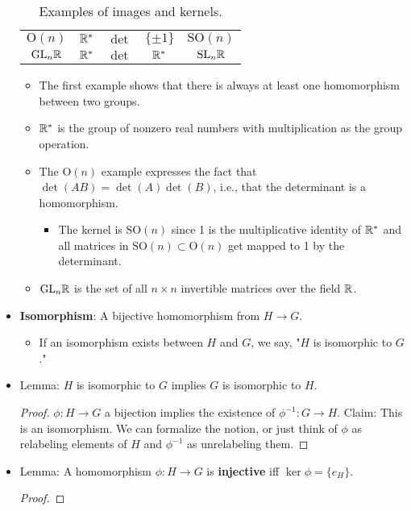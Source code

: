 \documentclass[../notes.tex]{subfiles}
\begin{document}
\begin{itemize}
\begin{table}[h!]
\begin{tabular}{c|c|c|c|c}
            $\text{O}(n)$ & $\mathbb{R}^*$ & $\det$ & $\{\pm 1\}$ & $\text{SO}(n)$\\
            $\text{GL}_n\mathbb{R}$ & $\mathbb{R}^*$ & $\det$ & $\mathbb{R}^*$ & $\text{SL}_n\mathbb{R}$\\
        \end{tabular}
        \caption{Examples of images and kernels.}
        \label{tab:ImKer}
    \end{table}
    \begin{itemize}
        \item The first example shows that there is always at least one homomorphism between two groups.
        \item $\mathbb{R}^*$ is the group of nonzero real numbers with multiplication as the group operation.
        \item The $\text{O}(n)$ example expresses the fact that $\det(AB)=\det(A)\det(B)$, i.e., that the determinant is a homomorphism.
        \begin{itemize}
            \item The kernel is $\text{SO}(n)$ since 1 is the multiplicative identity of $\mathbb{R}^*$ and all matrices in $\text{SO}(n)\subset\text{O}(n)$ get mapped to 1 by the determinant.
        \end{itemize}
        \item $\text{GL}_n\mathbb{R}$ is the set of all $n\times n$ invertible matrices over the field $\mathbb{R}$.
    \end{itemize}
    \item \textbf{Isomorphism}: A bijective homomorphism from $H\to G$.
    \begin{itemize}
        \item If an isomorphism exists between $H$ and $G$, we say, "$H$ is isomorphic to $G$."
    \end{itemize}
    \item Lemma: $H$ is isomorphic to $G$ implies $G$ is isomorphic to $H$.
    \begin{proof}
        $\phi:H\to G$ a bijection implies the existence of $\phi^{-1}:G\to H$. Claim: This is an isomorphism. We can formalize the notion, or just think of $\phi$ as relabeling elements of $H$ and $\phi^{-1}$ as unrelabeling them.
    \end{proof}
    \item Lemma: A homomorphism $\phi:H\to G$ is \textbf{injective} iff $\ker\phi=\{e_H\}$.
    \begin{proof}

\end{proof}
\end{itemize}
\end{document}
